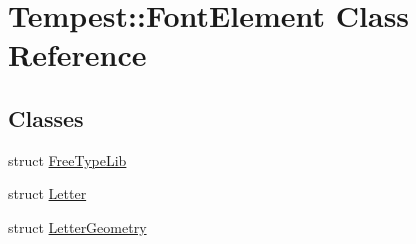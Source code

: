 \hypertarget{class_tempest_1_1_font_element}{\section{Tempest\+:\+:Font\+Element Class Reference}
\label{class_tempest_1_1_font_element}
}
\subsection*{Classes}
\begin{DoxyCompactItemize}
\item 
struct \hyperlink{struct_tempest_1_1_font_element_1_1_free_type_lib}{Free\+Type\+Lib}
\item 
struct \hyperlink{struct_tempest_1_1_font_element_1_1_letter}{Letter}
\item 
struct \hyperlink{struct_tempest_1_1_font_element_1_1_letter_geometry}{Letter\+Geometry}
\end{DoxyCompactItemize}
